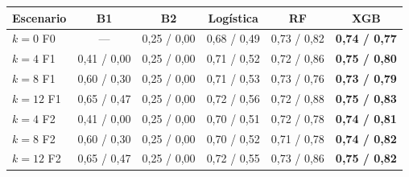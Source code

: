 \begin{tabular}{@{}lccccc@{}}
\toprule
Escenario & B1 & B2 & Logística & RF & XGB \\
\midrule
$k=0$ F0 & — & 0,25 / 0,00 & 0,68 / 0,49 & 0,73 / 0,82 & \textbf{0,74 / 0,77} \\
$k=4$ F1 & 0,41 / 0,00 & 0,25 / 0,00 & 0,71 / 0,52 & 0,72 / 0,86 & \textbf{0,75 / 0,80} \\
$k=8$ F1 & 0,60 / 0,30 & 0,25 / 0,00 & 0,71 / 0,53 & 0,73 / 0,76 & \textbf{0,73 / 0,79} \\
$k=12$ F1 & 0,65 / 0,47 & 0,25 / 0,00 & 0,72 / 0,56 & 0,72 / 0,88 & \textbf{0,75 / 0,83} \\
$k=4$ F2 & 0,41 / 0,00 & 0,25 / 0,00 & 0,70 / 0,51 & 0,72 / 0,78 & \textbf{0,74 / 0,81} \\
$k=8$ F2 & 0,60 / 0,30 & 0,25 / 0,00 & 0,70 / 0,52 & 0,71 / 0,78 & \textbf{0,74 / 0,82} \\
$k=12$ F2 & 0,65 / 0,47 & 0,25 / 0,00 & 0,72 / 0,55 & 0,73 / 0,86 & \textbf{0,75 / 0,82} \\
\bottomrule
\end{tabular}
